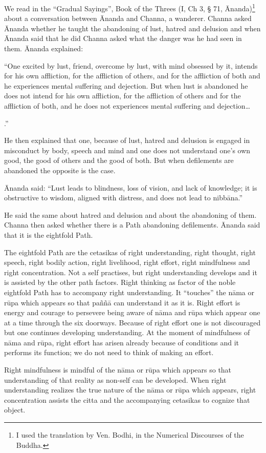 {{{We read in the ``Gradual Sayings'',
Book of the Threes (I, Ch 3, § 71,
Ānanda)\footnote{I used the translation by Ven.
Bodhi, in the Numerical Discourses of the Buddha.}
about a conversation between Ānanda and Channa, a wanderer. Channa asked
Ānanda whether he taught the abandoning of lust, hatred and delusion and
when Ānanda said that he did Channa asked what the danger was he had
seen in them. Ānanda explained:

``One excited by lust, friend, overcome
by lust, with mind obsessed by it, intends for his own affliction, for
the affliction of others, and for the affliction of both and he
experiences mental suffering and dejection. But when lust is abandoned
he does not intend for his own affliction, for the affliction of others
and for the affliction of both, and he does not experiences mental
suffering and dejection\ldots{.'' 

He then explained that one, because of
lust, hatred and delusion is engaged in misconduct by body, speech and
mind and one does not understand one's own good, the good of others and
the good of both. But when defilements are abandoned the opposite is the
case. 

Ānanda said: ``Lust leads to blindness,
loss of vision, and lack of knowledge; it is obstructive to wisdom,
aligned with distress, and does not lead to nibbāna.''

He said the same about hatred and
delusion and about the abandoning of them. Channa then asked whether
there is a Path abandoning defilements. Ānanda said that it is the
eightfold Path.

The eightfold Path are the cetasikas of
right understanding, right thought, right speech, right bodily action,
right livelihood, right effort, right mindfulness and right
concentration. Not a self practises, but right understanding develops
and it is assisted by the other path factors. Right thinking as factor
of the noble eightfold Path has to accompany right understanding. It
``touches'' the nāma or rūpa which appears so that paññā can understand
it as it is. Right effort is energy and courage to persevere being aware
of nāma and rūpa which appear one at a time through the six doorways.
Because of right effort one is not discouraged but one continues
developing understanding. At the moment of mindfulness of nāma and rūpa,
right effort has arisen already because of conditions and it performs
its function; we do not need to think of making an effort.

Right mindfulness is mindful of the
nāma or rūpa which appears so that understanding of that reality as
non-self can be developed. When right understanding realizes the true
nature of the nāma or rūpa which appears, right concentration assists
the citta and the accompanying cetasikas to cognize that object.

}}}}
